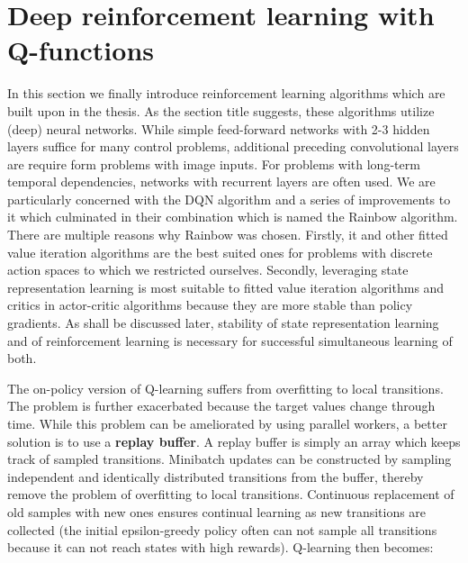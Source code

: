 \section{Deep reinforcement learning with Q-functions}
\label{sec-drl}
In this section we finally introduce reinforcement learning algorithms
which are built upon in the thesis.
As the section title suggests, these algorithms utilize (deep) neural networks.
While simple feed-forward networks with 2-3 hidden layers suffice for many control problems,
additional preceding convolutional layers are require form problems with image inputs.
For problems with long-term temporal dependencies, networks with recurrent layers are often used.
We are particularly concerned with the DQN algorithm \cite{mnih2013atari} and a series of improvements to it which culminated
in their combination which is named the Rainbow algorithm.
There are multiple reasons why Rainbow was chosen.
Firstly, it and other fitted value iteration algorithms are the best suited ones for
problems with discrete action spaces to which we restricted ourselves.
Secondly, leveraging state representation learning is most suitable to
fitted value iteration algorithms and critics in actor-critic algorithms because 
they are more stable than policy gradients. 
As shall be discussed later, stability of state representation learning and of reinforcement learning
is necessary for successful simultaneous learning of both.

The on-policy version of Q-learning suffers from overfitting to local transitions.
The problem is further exacerbated because the target values change through time.
While this problem can be ameliorated by using parallel workers,
a better solution is to use a \textbf{replay buffer}.
A replay buffer is simply an array which keeps track of sampled transitions.
Minibatch updates can be constructed by sampling independent and identically distributed
transitions from the buffer, thereby remove the problem of overfitting to local transitions.
Continuous replacement of old samples with new ones ensures continual learning as
new transitions are collected (the initial epsilon-greedy policy often can not sample all transitions
because it can not reach states with high rewards).
Q-learning then becomes:

